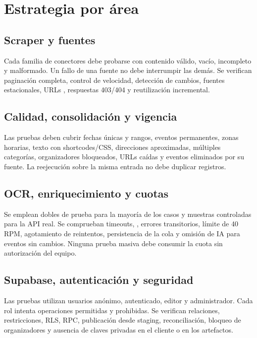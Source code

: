 \documentclass[11pt,a4paper]{article}
\begin{document}
\section{Estrategia por área}

\subsection{Scraper y fuentes}

Cada familia de conectores debe probarse con contenido válido, vacío, incompleto y
malformado. Un fallo de una fuente no debe interrumpir las demás. Se verifican
paginación completa, control de velocidad, detección de cambios, fuentes estacionales,
URLs , respuestas 403/404 y reutilización incremental.

\subsection{Calidad, consolidación y vigencia}

Las pruebas deben cubrir fechas únicas y rangos, eventos permanentes, zonas horarias,
texto con shortcodes/CSS, direcciones aproximadas, múltiples categorías, organizadores
bloqueados, URLs caídas y eventos eliminados por su fuente. La reejecución sobre la misma
entrada no debe duplicar registros.

\subsection{OCR, enriquecimiento y cuotas}

Se emplean dobles de prueba para la mayoría de los casos y muestras controladas para la
API real. Se comprueban timeouts, , errores transitorios, límite de 40
RPM, agotamiento de reintentos, persistencia de la cola y omisión de IA para eventos sin
cambios. Ninguna prueba masiva debe consumir la cuota sin autorización del equipo.

\subsection{Supabase, autenticación y seguridad}

Las pruebas utilizan usuarios anónimo, autenticado, editor y administrador. Cada rol
intenta operaciones permitidas y prohibidas. Se verifican relaciones, restricciones,
RLS, RPC, publicación desde staging, reconciliación, bloqueo de organizadores y ausencia
de claves privadas en el cliente o en los artefactos.
\end{document}
